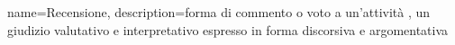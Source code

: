 {
	name={Recensione},
	description={forma di commento o voto a un'attività , un giudizio valutativo e interpretativo espresso in forma discorsiva e argomentativa}
}